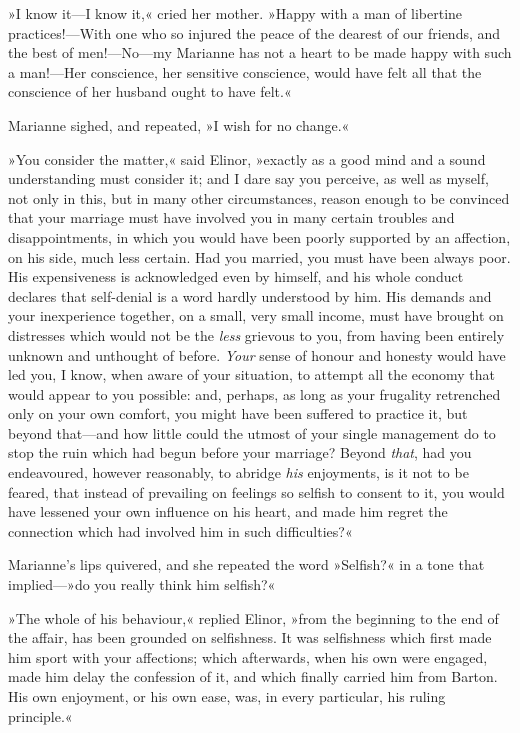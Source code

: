 »I know it—I know it,« cried her mother. »Happy with a man of libertine practices!—With one who so injured the peace of the dearest of our friends, and the best of men!—No—my Marianne has not a heart to be made happy with such a man!—Her conscience, her sensitive conscience, would have felt all that the conscience of her husband ought to have felt.«

Marianne sighed, and repeated, »I wish for no change.«

»You consider the matter,« said Elinor, »exactly as a good mind and a sound understanding must consider it; and I dare say you perceive, as well as myself, not only in this, but in many other circumstances, reason enough to be convinced that your marriage must have involved you in many certain troubles and disappointments, in which you would have been poorly supported by an affection, on his side, much less certain. Had you married, you must have been always poor. His expensiveness is acknowledged even by himself, and his whole conduct declares that self-denial is a word hardly understood by him. His demands and your inexperience together, on a small, very small income, must have brought on distresses which would not be the \textit{less} grievous to you, from having been entirely unknown and unthought of before. \textit{Your} sense of honour and honesty would have led you, I know, when aware of your situation, to attempt all the economy that would appear to you possible: and, perhaps, as long as your frugality retrenched only on your own comfort, you might have been suffered to practice it, but beyond that—and how little could the utmost of your single management do to stop the ruin which had begun before your marriage? Beyond \textit{that}, had you endeavoured, however reasonably, to abridge \textit{his} enjoyments, is it not to be feared, that instead of prevailing on feelings so selfish to consent to it, you would have lessened your own influence on his heart, and made him regret the connection which had involved him in such difficulties?«

Marianne’s lips quivered, and she repeated the word »Selfish?« in a tone that implied—»do you really think him selfish?«

»The whole of his behaviour,« replied Elinor, »from the beginning to the end of the affair, has been grounded on selfishness. It was selfishness which first made him sport with your affections; which afterwards, when his own were engaged, made him delay the confession of it, and which finally carried him from Barton. His own enjoyment, or his own ease, was, in every particular, his ruling principle.«

